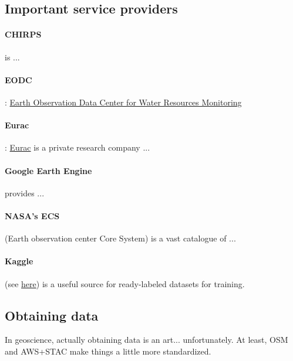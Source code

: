 \subsection{Important service providers}
\paragraph{CHIRPS} is ...

\paragraph{EODC}: \href{https://www.eodc.eu/}{Earth Observation Data Center for Water Resources Monitoring}

\paragraph{Eurac}: \href{http://www.eurac.edu}{Eurac} is a private research company ...

\paragraph{Google Earth Engine} provides ...

\paragraph{NASA's ECS} (Earth observation center Core System) is a vast catalogue of ...

\paragraph{Kaggle} (see \href{https://www.kaggle.com/search?q=sentinel}{here}) is a useful source for ready-labeled datasets for training.


\subsection{Obtaining data}
In geoscience, actually obtaining data is an art... unfortunately. At least, OSM and AWS+STAC make things a little more standardized.

